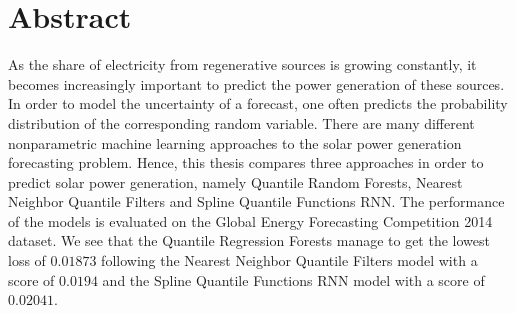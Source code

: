 
\chapter*{Abstract}

\begin{center}
  \begin{minipage}{12cm}
    \begin{sloppypar}
      As the share of electricity from regenerative sources is growing constantly, 
      it becomes increasingly important to predict the power generation of these sources. 
      In order to model the uncertainty of a forecast, one often predicts the probability 
      distribution of the corresponding random variable. There are many different nonparametric machine learning approaches 
      to the solar power generation forecasting problem. Hence, this thesis compares three approaches 
      in order to predict solar power generation, namely Quantile Random Forests, Nearest Neighbor Quantile Filters and 
      Spline Quantile Functions RNN. The performance of the models is evaluated on the Global Energy Forecasting Competition 2014 
      dataset. 
      We see that the Quantile Regression Forests manage to get the lowest loss of \(0.01873\) following 
      the Nearest Neighbor Quantile Filters model with a score of \(0.0194\) and the Spline Quantile Functions RNN model with a score of \(0.02041\). 
    \end{sloppypar}
  \end{minipage}
\end{center}